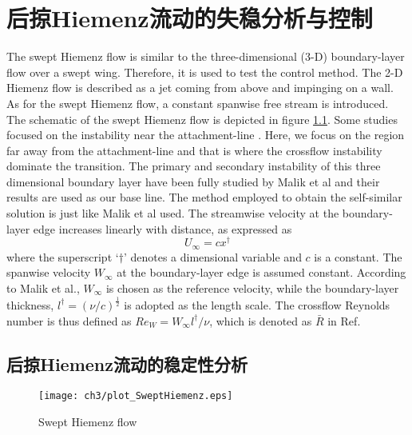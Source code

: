 \chapter{后掠Hiemenz流动的失稳分析与控制}
The swept Hiemenz flow is similar to the three-dimensional (3-D) boundary-layer flow over a swept wing. Therefore, it is used to test the control method. The 2-D Hiemenz flow is described as a jet coming from above and impinging on a wall. As for the swept Hiemenz flow, a constant spanwise free stream is introduced. The schematic of the swept Hiemenz flow is depicted in figure \ref{fig:SweptHiemenz}. Some studies focused on the instability near the attachment-line \cite{Lin1996,Guegan2006}. Here, we focus on the region far away from the attachment-line and that is where the crossflow instability dominate the transition. The primary and secondary instability of this three dimensional boundary layer have been fully studied by Malik et al \cite{Malik1994} and their results are used as our base line. The method employed to obtain the self-similar solution is just like Malik et al used. The streamwise velocity at the boundary-layer edge increases linearly with distance, as expressed as
\begin{equation}\label{e:HiemenzF}
  U_{\infty}=cx^{\dagger}
\end{equation}
where the superscript `$\dagger$' denotes a dimensional variable and $c$ is a constant. The spanwise velocity $W_{\infty}$ at the boundary-layer edge is assumed constant. According to Malik et al.\cite{Malik1994}, $W_{\infty}$ is chosen as the reference velocity, while the boundary-layer thickness, $l^\dagger=(\nu/c)^{\frac{1}{2}}$ is adopted as the length scale. The crossflow Reynolds number is thus defined as $Re_W=W_{\infty}l^\dagger/\nu$, which is denoted as $\bar{R}$ in Ref\cite{Malik1994}.
\section{后掠Hiemenz流动的稳定性分析}

\begin{figure}
  \centering
  \texttt{[image: ch3/plot\_SweptHiemenz.eps]}\\
  \caption{Swept Hiemenz flow}\label{fig:SweptHiemenz}
\end{figure}


